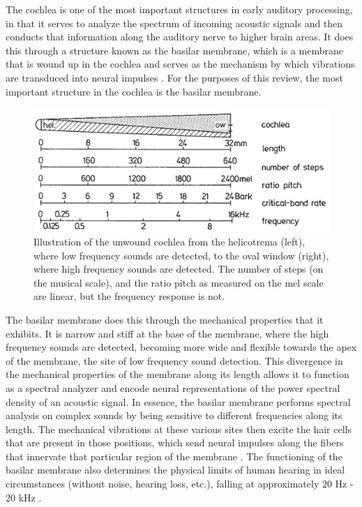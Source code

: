 \documentclass[titlepage]{article}
\begin{document}
    The cochlea is one of the most important structures in early auditory processing,
    in that it serves to analyze the spectrum of incoming acoustic signals and then
    conducts that information along the auditory nerve to higher brain areas.
    It does this through a structure known as the basilar membrane, which is a
    membrane that is wound up in the cochlea and serves as the mechanism by which
    vibrations are transduced into neural impulses \cite{Kandel2000}. For the purposes
    of this review, the most important structure in the cochlea is the basilar membrane.

    \begin{figure}
      \centering
      \includegraphics[scale=0.30]{basilarMembrane}
      \caption{Illustration of the unwound cochlea from the helicotrema (left), where low
      frequency sounds are detected, to the oval window (right), where high
      frequency sounds are detected. The number of steps (on the musical
      scale), and the ratio pitch as measured on the mel scale are linear, but the
      frequency response is not.}
      \label{basilarMembrane}
    \end{figure}

    The basilar membrane does this through the mechanical properties that it exhibits.
    It is narrow and stiff at the base of the membrane, where the high frequency sounds
    are detected, becoming more wide and flexible towards the apex of the membrane, the
    site of low frequency sound detection. This divergence in the mechanical properties
    of the membrane along its length allows it to function as a spectral analyzer
    and encode neural representations of the power spectral density of an acoustic signal.
    In essence, the basilar membrane performs
    spectral analysis on complex sounds by being sensitive to different frequencies
    along its length. The mechanical vibrations at these various sites then excite
    the hair cells that are present in those positions, which send neural impulses along
    the fibers that innervate that particular region of the membrane \cite{Kandel2000}.
    The functioning of the basilar membrane also determines the physical limits of
    human hearing in ideal circumstances (without noise, hearing loss, etc.), falling
    at approximately 20 Hz - 20 kHz \cite{Rabiner2007}.
\end{document}
